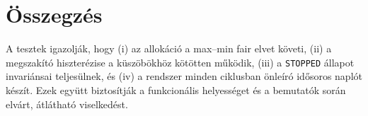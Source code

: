 \section*{Összegzés}
A tesztek igazolják, hogy (i) az allokáció a max--min fair elvet követi, (ii) a megszakító hiszterézise a küszöbökhöz kötötten működik, (iii) a \texttt{STOPPED} állapot invariánsai teljesülnek, és (iv) a rendszer minden ciklusban önleíró idősoros naplót készít. Ezek együtt biztosítják a funkcionális helyességet és a bemutatók során elvárt, átlátható viselkedést.
